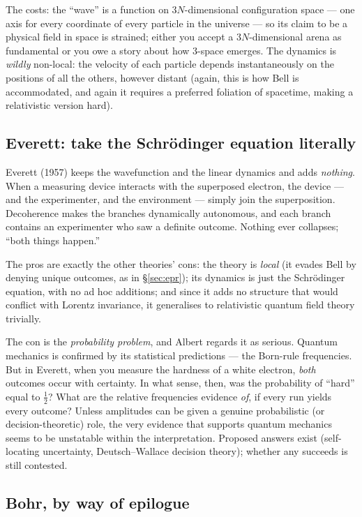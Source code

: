\documentclass[11pt,a4paper]{article}
\theoremstyle{remark}
\begin{document}
The costs: the ``wave'' is a function on $3N$-dimensional configuration space ---
one axis for every coordinate of every particle in the universe --- so its claim
to be a physical field in space is strained; either you accept a $3N$-dimensional
arena as fundamental or you owe a story about how 3-space emerges. The dynamics
is \emph{wildly} non-local: the velocity of each particle depends
instantaneously on the positions of all the others, however distant (again, this
is how Bell is accommodated, and again it requires a preferred foliation of
spacetime, making a relativistic version hard).

\subsection{Everett: take the Schr\"odinger equation literally}

Everett (1957) keeps the wavefunction and the linear dynamics and adds
\emph{nothing}. When a measuring device interacts with the superposed electron,
the device --- and the experimenter, and the environment --- simply join the
superposition. Decoherence makes the branches dynamically autonomous, and each
branch contains an experimenter who saw a definite outcome. Nothing ever
collapses; ``both things happen.''

The pros are exactly the other theories' cons: the theory is \emph{local} (it
evades Bell by denying unique outcomes, as in \S\ref{sec:epr}); its dynamics is
just the Schr\"odinger equation, with no ad hoc additions; and since it adds no
structure that would conflict with Lorentz invariance, it generalises to
relativistic quantum field theory trivially.

The con is the \emph{probability problem}, and Albert regards it as serious.
Quantum mechanics is confirmed by its statistical predictions --- the Born-rule
frequencies. But in Everett, when you measure the hardness of a white electron,
\emph{both} outcomes occur with certainty. In what sense, then, was the
probability of ``hard'' equal to $\tfrac12$? What are the relative frequencies
evidence \emph{of}, if every run yields every outcome? Unless amplitudes can
be given a genuine probabilistic (or decision-theoretic) role, the very evidence
that supports quantum mechanics seems to be unstatable within the
interpretation. Proposed answers exist (self-locating uncertainty,
Deutsch--Wallace decision theory); whether any succeeds is still contested.

\subsection{Bohr, by way of epilogue}
\end{document}
